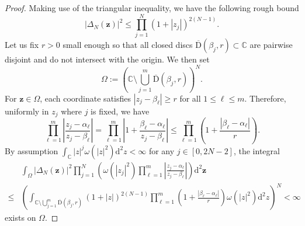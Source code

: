 \documentclass[10pt,a4paper]{amsart}
\newcommand{\C}{\mathbb{C}}
\begin{document}
\begin{proof}
    Making use of the triangular inequality, we have the following rough bound
    \begin{equation}
        \left|\Delta_{N}(\mathbf{z})\right|^{2}\leq \prod\limits_{j=1}^{N}(1+\left|z_{j}\right|)^{2(N-1)}.
    \end{equation}
    Let us fix $r>0$ small enough so that all closed discs $\overline{\mathrm{D}}(\beta_{j},r)\subset\C$ are pairwise disjoint and do not intersect with the origin. We then set
    \begin{equation}
        \Omega:=\left(\C\setminus \bigcup\limits_{j=1}^{m}\overline{\mathrm{D}}(\beta_{j},r)\right)^{N}.
    \end{equation}
    For $\mathbf{z}\in\Omega$, each coordinate satisfies $\left|z_{j}-\beta_{\ell}\right|\geq r$ for all $1\leq \ell\leq m$. Therefore, uniformly in $z_{j}$ where $j$ is fixed, we have
    \begin{equation}
        \prod\limits_{\ell=1}^{m}\left|\frac{z_{j}-\alpha_{\ell}}{z_{j}-\beta_{\ell}}\right|=\prod\limits_{\ell=1}^{m}\left|1+\frac{\beta_{\ell}-\alpha_{\ell}}{z_{j}-\beta_{\ell}}\right|\leq \prod\limits_{\ell=1}^{m}\left(1+\frac{|\beta_{\ell}-\alpha_{\ell}|}{r}\right).
    \end{equation}
    By assumption $\int_{\C}|z|^{j}\omega(|z|^2)\mathrm{d}^2z<\infty$ for any $j\in[0,2N-2]$, the integral 
    \begin{equation}
    \begin{split}
        &\int_{\Omega}\left|\Delta_{N}(\mathbf{z})\right|^{2}\prod\limits_{j=1}^{N}\left(\omega(\left|z_{j}\right|^{2})\prod\limits_{\ell=1}^{m}\left|\frac{z_{j}-\alpha_{\ell}}{z_{j}-\beta_{\ell}}\right|\right)\mathrm{d}^{2}\mathbf{z}
        \\
        \leq&\left(\int_{\C\setminus \bigcup\limits_{j=1}^{m}\overline{\mathrm{D}}(\beta_{j},r)}(1+\left|z\right|)^{2(N-1)}\prod\limits_{\ell=1}^{m}\left(1+\frac{|\beta_{\ell}-\alpha_{\ell}|}{r}\right)\omega(|z|^2)\mathrm{d}^2z\right)^N<\infty
    \end{split}
    \end{equation}
    exists on $\Omega$.



\end{proof}
\end{document}
